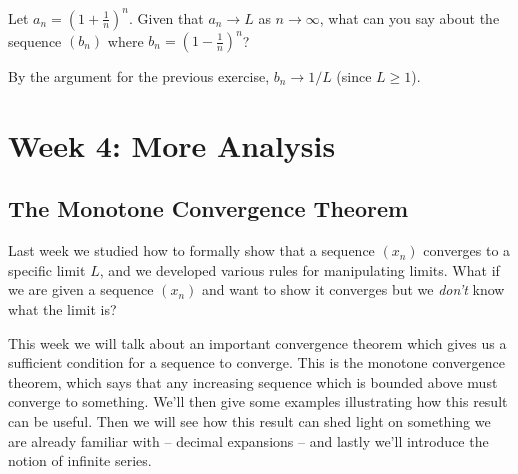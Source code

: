 \documentclass[11pt,dvipsnames]{book}
\numberwithin{figure}{section} %
\numberwithin{table}{section} %
\begin{document}
\begin{exercise}
Let $a_n = \left( 1+ \frac{1}{n}\right)^n$. Given that $a_n \to L$ as $n \to \infty$, what can you say about
the sequence $(b_n)$ where
$b_n = \left( 1- \frac{1}{n}\right)^n$?
\begin{solution}
By the argument for the previous exercise, $b_n \to 1/L$ (since $L \geq 1$).
\end{solution}
\end{exercise}

%
%


\part{Week 4: More Analysis}


\chapter{The Monotone Convergence Theorem}

Last week we studied how to formally show that a sequence $(x_{n})$ converges to a specific limit $L$, and we developed various rules for manipulating limits. What if we are given a sequence $(x_{n})$ and want to show it converges but we {\it don't} know what the limit is?

This week we will talk about an important convergence theorem which gives us a sufficient condition for a sequence to  converge. This is the monotone convergence theorem, which says that any increasing sequence which is bounded above must converge to something. %
We'll then give some examples illustrating how this result can be useful. Then we will see how this result can shed light on something we are already familiar with -- decimal expansions -- and lastly we'll introduce the notion of infinite series.
\end{document}
